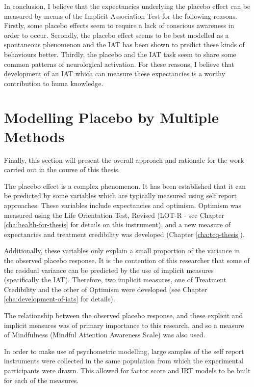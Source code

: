 In conclusion, I believe that the expectancies underlying the placebo effect can be measured by means of the Implicit Association Test for the following reasons. Firstly, some placebo effects seem to require a lack of conscious awareness in order to occur. Secondly, the placebo effect seems to be best modelled as a spontaneous phenomenon and the IAT has been shown to predict these kinds of behaviours better. Thirdly, the placebo and the IAT task seem to share some common patterns of neurological activation. For these reasons, I believe that  development of  an IAT which can measure these expectancies is a worthy contribution to huma knowledge. 

\section{Modelling Placebo by Multiple Methods}
\label{sec:modell-plac-mult}

Finally, this section will present the overall approach and rationale for the work carried out in the course of this thesis.

The placebo effect is a complex phenomenon. It has been established that it can be predicted by some variables which are typically measured using self report approaches. These variables include expectancies and optimism. Optimism was measured using the Life Orientation Test, Revised (LOT-R - see Chapter \ref{cha:health-for-thesis} for details on this instrument), and a new measure of expectancies and treatment credibility was developed (Chapter \ref{cha:tcq-thesis}). 

Additionally, these variables only explain a small proportion of the variance in the observed placebo response. It is the contention of this researcher that some of the residual variance can be predicted by the use of implicit measures (specifically the IAT). Therefore, two implicit measures, one of Treatment Credibility and the other of Optimism were developed (see Chapter \ref{cha:development-of-iats} for details). 

The relationship between the observed placebo response, and these explicit and implicit measures was of primary importance to this research, and so a measure of Mindfulness (Mindful Attention Awareness Scale) was also used. 

In order to make use of psychometric modelling, large samples of the self report instruments were collected in the same population from which the experimental participants were drawn. This allowed for factor score and IRT models to be built for each of the measures. 

